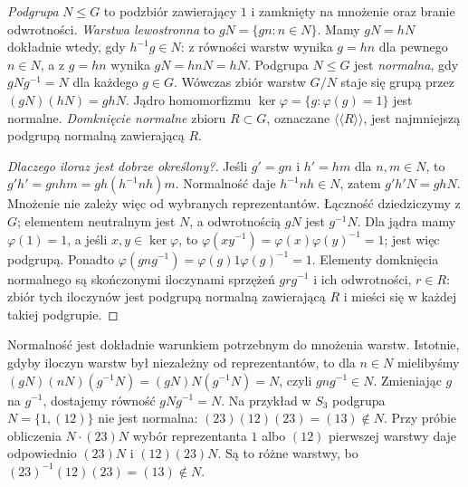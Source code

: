 \begin{definicja}
\label{def:normal-quotient-5}
\emph{Podgrupa} $N\leq G$ to podzbiór zawierający $1$
i zamknięty na mnożenie oraz branie odwrotności.
\emph{Warstwa lewostronna} to $gN=\{gn:n\in N\}$.
Mamy $gN=hN$ dokładnie wtedy, gdy $h^{-1}g\in N$:
z równości warstw wynika $g=hn$ dla pewnego $n\in N$,
a z $g=hn$ wynika $gN=hnN=hN$.
Podgrupa $N\leq G$ jest \emph{normalna},
gdy $gNg^{-1}=N$ dla każdego $g\in G$.
Wówczas zbiór warstw $G/N$ staje się
grupą przez $(gN)(hN)=ghN$.
Jądro homomorfizmu
$\ker\varphi=\{g:\varphi(g)=1\}$
jest normalne. \emph{Domknięcie normalne}
zbioru $R\subset G$, oznaczane
$\langle\!\langle R\rangle\!\rangle$,
jest najmniejszą podgrupą normalną
zawierającą $R$.
\end{definicja}

\begin{proof}[Dlaczego iloraz jest dobrze określony?]
Jeśli $g'=gn$ i $h'=hm$ dla $n,m\in N$,
to $g'h'=gnhm=gh(h^{-1}nh)m$.
Normalność daje $h^{-1}nh\in N$,
zatem $g'h'N=ghN$. Mnożenie
nie zależy więc od wybranych
reprezentantów. Łączność dziedziczymy z $G$;
elementem neutralnym jest $N$, a odwrotnością $gN$ jest $g^{-1}N$.
Dla jądra mamy $\varphi(1)=1$, a jeśli $x,y\in\ker\varphi$,
to $\varphi(xy^{-1})=\varphi(x)\varphi(y)^{-1}=1$;
jest więc podgrupą. Ponadto
$\varphi(gng^{-1})=
\varphi(g)1\varphi(g)^{-1}=1$.
Elementy domknięcia normalnego
są skończonymi iloczynami
sprzężeń $grg^{-1}$ i ich
odwrotności, $r\in R$:
zbiór tych iloczynów jest
podgrupą normalną zawierającą
$R$ i mieści się w każdej takiej
podgrupie.
\end{proof}

Normalność jest dokładnie warunkiem potrzebnym do mnożenia warstw.
Istotnie, gdyby iloczyn warstw był niezależny od reprezentantów,
to dla $n\in N$ mielibyśmy
$(gN)(nN)(g^{-1}N)=(gN)N(g^{-1}N)=N$,
czyli $gng^{-1}\in N$. Zmieniając $g$ na $g^{-1}$,
dostajemy równość $gNg^{-1}=N$.
Na przykład w $S_3$ podgrupa $N=\{1,(12)\}$ nie jest normalna:
$(23)(12)(23)=(13)\notin N$. Przy próbie obliczenia
$N\cdot(23)N$ wybór reprezentanta $1$ albo $(12)$ pierwszej
warstwy daje odpowiednio $(23)N$ i $(12)(23)N$.
Są to różne warstwy, bo $(23)^{-1}(12)(23)=(13)\notin N$.

